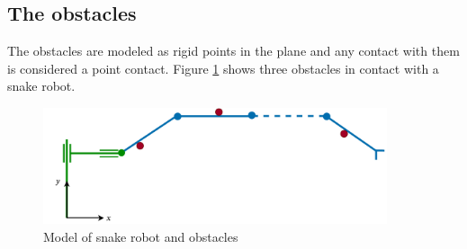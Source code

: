 \subsection{The obstacles}

The obstacles are modeled as rigid points in the plane and any contact with them is considered a point contact. Figure \ref{fig:2_kin_obst} shows three obstacles in contact with a snake robot.

\begin{figure}[h!]
    \centering
    \includegraphics[width=0.9\textwidth]{figures/modelspecs/superbasicsnakenobstacles.pdf}
    \caption{Model of snake robot and obstacles}
    \label{fig:2_kin_obst}
\end{figure}
